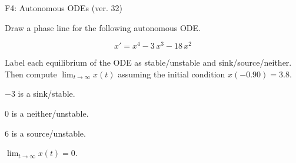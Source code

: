 \begin{exercise}
  \begin{exerciseTitle}F4: Autonomous ODEs (ver. 32)\end{exerciseTitle}
  \begin{exerciseStatement}
    

      Draw a phase line for the following 
      autonomous ODE.
    

    
\[x'= x^{4} - 3 \, x^{3} - 18 \, x^{2}\]

    

      Label each equilibrium of the ODE
      as stable/unstable and sink/source/neither.
      Then compute \(\lim_{t\to\infty}x(t)\)
      assuming the initial condition
      \(x( -0.90 )= 3.8\).
    

  \end{exerciseStatement}
  \begin{exerciseAnswer}
    

      \(-3\) is a sink/stable.
      
        \(0\) is a neither/unstable.
      
      \(6\) is a source/unstable.
    

    

      \(\lim_{t\to\infty}x(t)=0\).
    

  \end{exerciseAnswer}
\end{exercise}